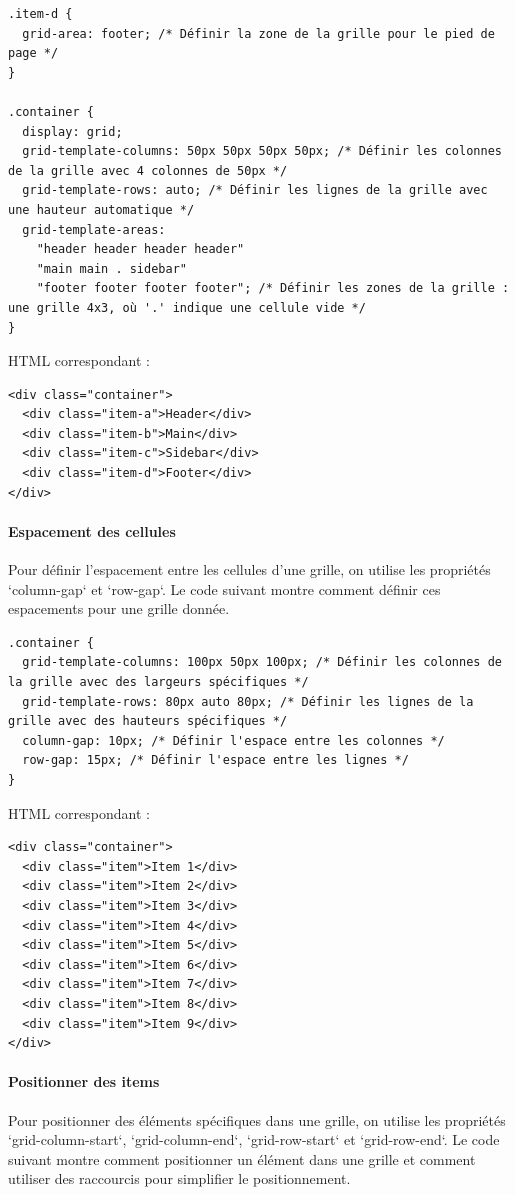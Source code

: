 \documentclass{report}
\begin{document}
\begin{multicols*}{2}
\begin{lstlisting}[style=CSSDraculaLight]
.item-d {
  grid-area: footer; /* Définir la zone de la grille pour le pied de page */
}

.container {
  display: grid;
  grid-template-columns: 50px 50px 50px 50px; /* Définir les colonnes de la grille avec 4 colonnes de 50px */
  grid-template-rows: auto; /* Définir les lignes de la grille avec une hauteur automatique */
  grid-template-areas:
    "header header header header"
    "main main . sidebar"
    "footer footer footer footer"; /* Définir les zones de la grille : une grille 4x3, où '.' indique une cellule vide */
}
\end{lstlisting}

HTML correspondant :
\begin{lstlisting}[style=HTMLDraculaDark]
<div class="container">
  <div class="item-a">Header</div>
  <div class="item-b">Main</div>
  <div class="item-c">Sidebar</div>
  <div class="item-d">Footer</div>
</div>
\end{lstlisting}

\paragraph{Espacement des cellules}
Pour définir l'espacement entre les cellules d'une grille, on utilise les propriétés `column-gap` et `row-gap`. Le code suivant montre comment définir ces espacements pour une grille donnée.

\begin{lstlisting}[style=CSSDraculaLight]
.container {
  grid-template-columns: 100px 50px 100px; /* Définir les colonnes de la grille avec des largeurs spécifiques */
  grid-template-rows: 80px auto 80px; /* Définir les lignes de la grille avec des hauteurs spécifiques */
  column-gap: 10px; /* Définir l'espace entre les colonnes */
  row-gap: 15px; /* Définir l'espace entre les lignes */
}
\end{lstlisting}

HTML correspondant :
\begin{lstlisting}[style=HTMLDraculaDark]
<div class="container">
  <div class="item">Item 1</div>
  <div class="item">Item 2</div>
  <div class="item">Item 3</div>
  <div class="item">Item 4</div>
  <div class="item">Item 5</div>
  <div class="item">Item 6</div>
  <div class="item">Item 7</div>
  <div class="item">Item 8</div>
  <div class="item">Item 9</div>
</div>
\end{lstlisting}

\paragraph{Positionner des items}
Pour positionner des éléments spécifiques dans une grille, on utilise les propriétés `grid-column-start`, `grid-column-end`, `grid-row-start` et `grid-row-end`. Le code suivant montre comment positionner un élément dans une grille et comment utiliser des raccourcis pour simplifier le positionnement.


\end{multicols*}
\end{document}
